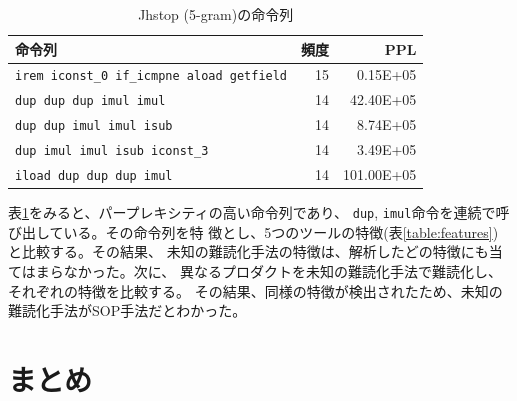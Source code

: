 \documentclass[a4j,fleqn,10pt]{jarticle}
\begin{document}
\begin{table}[t]
  \centering
  \footnotesize{
    \caption{Jhstop (5-gram)の命令列}\label{table:jhstop}
  \begin{tabular}{l|r|r}
    命令列 & 頻度 & PPL \\ \hline
    \texttt{irem iconst\_0 if\_icmpne aload getfield} & 15 &   0.15E+05 \\
    \texttt{dup dup dup imul imul}                    & 14 &  42.40E+05 \\
    \texttt{dup dup imul imul isub}                   & 14 &   8.74E+05 \\
    \texttt{dup imul imul isub iconst\_3}             & 14 &   3.49E+05 \\
    \texttt{iload dup dup dup imul}                   & 14 & 101.00E+05 \\
    \end{tabular}}
\end{table}

表\ref{table:jhstop}をみると、パープレキシティの高い命令列であり、
\texttt{dup}, \texttt{imul}命令を連続で呼び出している。その命令列を特
徴とし、5つのツールの特徴(表\ref{table:features})と比較する。その結果、
未知の難読化手法の特徴は、解析したどの特徴にも当てはまらなかった。次に、
異なるプロダクトを未知の難読化手法で難読化し、それぞれの特徴を比較する。
その結果、同様の特徴が検出されたため、未知の難読化手法がSOP手法だとわかった。
 
\section{まとめ}
\end{document}
